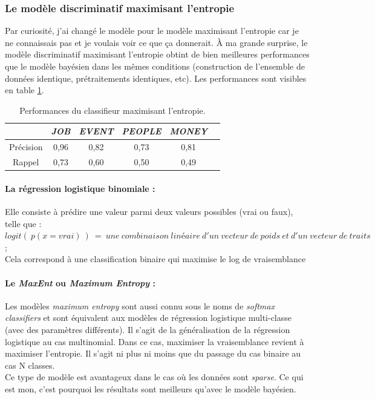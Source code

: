             \subsubsection{Le modèle discriminatif maximisant l'entropie}
                Par curiosité, j'ai changé le modèle pour le modèle maximisant l'entropie car je ne connaissais pas et je voulais voir ce que ça donnerait. À ma grande surprise, le modèle discriminatif maximisant l'entropie obtint de bien meilleures performances que le modèle bayésien dans les mêmes conditions (construction de l'ensemble de données identique, prétraitements identiques, etc). Les performances sont visibles en table \ref{tab:classif_perf3}.
                \begin{table}[h]
                    \centering
                    \begin{tabular}{| c | c | c | c | c | c |}
                        \hline
                         & \textit{JOB} & \textit{EVENT} & \textit{PEOPLE} & \textit{MONEY} \\
                        \hline
                        Précision & 0,96 & 0,82 & 0,73 & 0,81 \\
                        Rappel & 0,73 & 0,60 & 0,50 & 0,49 \\
                        \hline
                    \end{tabular}
                    \caption{Performances du classifieur maximisant l'entropie.}
                    \label{tab:classif_perf3}
                \end{table}

                \paragraph{La régression logistique binomiale :}
                    Elle consiste à prédire une valeur parmi deux valeurs possibles (vrai ou faux), telle que :\\
                    $logit(\ p(x=vrai)\ )\ =\ une\ combinaison\ linéaire\ d'un\ vecteur\ de\ poids\ et\ d'un\ vecteur\ de\ traits$ ;\\
                    Cela correspond à une classification binaire qui maximise le log de vraisemblance

                \paragraph{Le \textit{MaxEnt} ou \textit{Maximum Entropy} :}
                    Les modèles \textit{maximum entropy} sont aussi connu sous le noms de \textit{softmax classifiers} et sont équivalent aux modèles de régression logistique multi-classe (avec des paramètres différents). Il s'agit de la généralisation de la régression logistique au cas multinomial. Dans ce cas, maximiser la vraisemblance revient à maximiser l'entropie. Il s'agit ni plus ni moins que du passage du cas binaire au cas N classes.\\
                    Ce type de modèle est avantageux dans le cas où les données sont \textit{sparse}. Ce qui est mon, c'est pourquoi les résultats sont meilleurs qu'avec le modèle bayésien.

